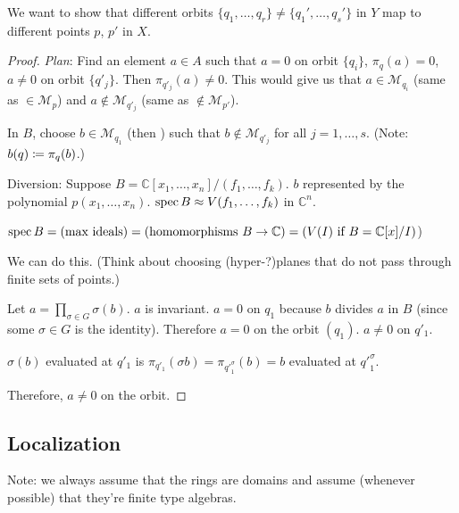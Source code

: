 \documentclass [letterpaper,11pt,twoside]{article}
\begin{document}
  We want to show that different orbits $\{q_1, \ldots, q_r\} \ne \{q_1', \ldots, q_s'\}$ in $Y$ map to different points $p$, $p'$ in $X$.

  \begin{proof}
    \emph{Plan}: Find an element $a\in A$ such that $a = 0$ on orbit $\{q_i\}$, $\pi_q(a) = 0$, $a \ne 0$ on orbit $\{q'_j\}$.  Then $\pi_{q'_j}(a) \ne 0$.  This would give us that $a\in \mathcal M_{q_i}$ (same as $\in \mathcal M_p$) and $a\notin \mathcal M_{q'_j}$ (same as $\notin \mathcal M_{p'}$).

    In $B$, choose $b\in \mathcal M_{q_1}$ (then ) such that $b\notin \mathcal M_{q'_j}$ for all $j = 1, \ldots, s$.  (Note: $b(q) \coloneqq \pi_q(b)$.)

    \begin{digression}
      Diversion: Suppose $B = \mathbb C[x_1, \ldots, x_n] / (f_1, \ldots, f_k)$.  $b$ represented by the polynomial $p(x_1, \ldots, x_n)$.  $\operatorname{spec} B \approx V(f_1, \ldots, f_k)$ in $\mathbb C^n$.

      $\operatorname{spec} B = (\text{max ideals}) = (\text{homomorphisms }B \to \mathbb C) = (V(I)\text{ if }B = \mathbb C[x] / I)$)
    \end{digression}

    We can do this. (Think about choosing (hyper-?)planes that do not pass through finite sets of points.)

    Let $a = \displaystyle \prod_{\sigma\in G} \sigma(b)$.  $a$ is invariant.  $a = 0$ on $q_1$ because $b$ divides $a$ in $B$ (since some $\sigma \in G$ is the identity).  Therefore $a = 0$ on the orbit $(q_1)$.  $a \ne 0$ on $q'_1$.

    $\sigma(b)$ evaluated at $q'_1$ is $\pi_{q'_1}(\sigma b) = \pi_{{q'}_1^\sigma}(b) = b$ evaluated at ${q'}_1^\sigma$.

    Therefore, $a \ne 0$ on the orbit.
  \end{proof}

  \subsection{Localization}
    Note: we always assume that the rings are domains and assume (whenever possible) that they're finite type algebras.
\end{document}
